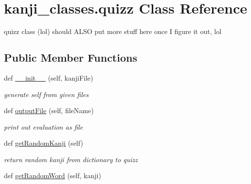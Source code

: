 \hypertarget{classkanji__classes_1_1quizz}{}\section{kanji\+\_\+classes.\+quizz Class Reference}
\label{classkanji__classes_1_1quizz}


quizz class (lol) should A\+L\+SO put more stuff here once I figure it out, lol  


\subsection*{Public Member Functions}
\begin{DoxyCompactItemize}
\item 
\mbox{\label{classkanji__classes_1_1quizz_a6f0f48eba8dfa3b02b03c0d75da600ee}} 
def \mbox{\hyperlink{classkanji__classes_1_1quizz_a6f0f48eba8dfa3b02b03c0d75da600ee}{\+\_\+\+\_\+init\+\_\+\+\_\+}} (self, kanji\+File)
\begin{DoxyCompactList}\small\item\em generate self from given files \end{DoxyCompactList}\item 
\mbox{\label{classkanji__classes_1_1quizz_a7a771afc560ca562db923cc5bda04181}} 
def \mbox{\hyperlink{classkanji__classes_1_1quizz_a7a771afc560ca562db923cc5bda04181}{output\+File}} (self, file\+Name)
\begin{DoxyCompactList}\small\item\em print out evaluation as file \end{DoxyCompactList}\item 
\mbox{\label{classkanji__classes_1_1quizz_a47abe5a410d90269c6c10f05d0e0e306}} 
def \mbox{\hyperlink{classkanji__classes_1_1quizz_a47abe5a410d90269c6c10f05d0e0e306}{get\+Random\+Kanji}} (self)
\begin{DoxyCompactList}\small\item\em return random kanji from dictionary to quizz \end{DoxyCompactList}\item 
\mbox{\label{classkanji__classes_1_1quizz_a7082382665a7b6cdd61b2d6424f3d558}} 
def \mbox{\hyperlink{classkanji__classes_1_1quizz_a7082382665a7b6cdd61b2d6424f3d558}{get\+Random\+Word}} (self, kanji)

\end{DoxyCompactItemize}
